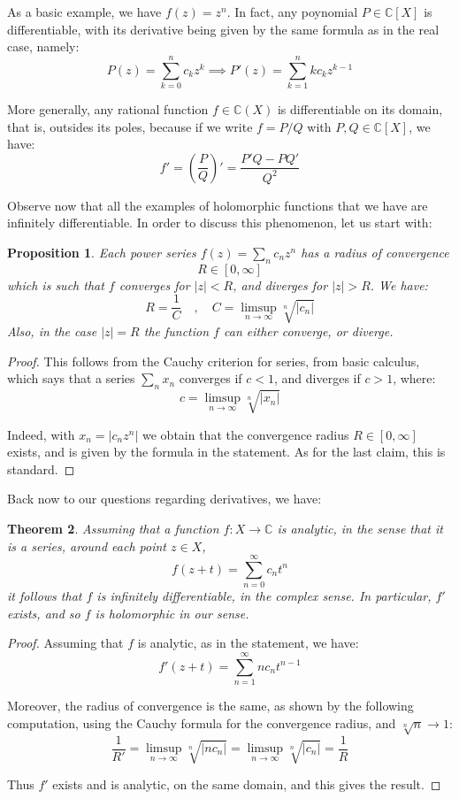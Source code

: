 \documentclass[12pt]{amsbook}
\newtheorem{theorem}{Theorem}[chapter]
\newtheorem{proposition}[theorem]{Proposition}
\begin{document}
As a basic example, we have $f(z)=z^n$. In fact, any poynomial $P\in\mathbb C[X]$ is differentiable, with its derivative being given by the same formula as in the real case, namely:
$$P(z)=\sum_{k=0}^nc_kz^k\implies P'(z)=\sum_{k=1}^nkc_kz^{k-1}$$

More generally, any rational function $f\in\mathbb C(X)$ is differentiable on its domain, that is, outsides its poles, because if we write $f=P/Q$ with $P,Q\in\mathbb C[X]$, we have:
$$f'=\left(\frac{P}{Q}\right)'=\frac{P'Q-PQ'}{Q^2}$$

Observe now that all the examples of holomorphic functions that we have are infinitely differentiable. In order to discuss this phenomenon, let us start with:

\begin{proposition}
Each power series $f(z)=\sum_nc_nz^n$ has a radius of convergence 
$$R\in[0,\infty]$$
which is such that $f$ converges for $|z|<R$, and diverges for $|z|>R$. We have:
$$R=\frac{1}{C}\quad,\quad C=\limsup_{n\to\infty}\sqrt[n]{|c_n|}$$
Also, in the case $|z|=R$ the function $f$ can either converge, or diverge.
\end{proposition}

\begin{proof}
This follows from the Cauchy criterion for series, from basic calculus, which says that a series $\sum_nx_n$ converges if $c<1$, and diverges if $c>1$, where:
$$c=\limsup_{n\to\infty}\sqrt[n]{|x_n|}$$

Indeed, with $x_n=|c_nz^n|$ we obtain that the convergence radius $R\in[0,\infty]$ exists, and is given by the formula in the statement. As for the last claim, this is standard.
\end{proof}

Back now to our questions regarding derivatives, we have:


\begin{theorem}
Assuming that a function $f:X\to\mathbb C$ is analytic, in the sense that it is a series, around each point $z\in X$, 
$$f(z+t)=\sum_{n=0}^\infty c_nt^n$$
it follows that $f$ is infinitely differentiable, in the complex sense. In particular, $f'$ exists, and so $f$ is holomorphic in our sense.
\end{theorem}

\begin{proof}
Assuming that $f$ is analytic, as in the statement, we have:
$$f'(z+t)=\sum_{n=1}^\infty nc_nt^{n-1}$$

Moreover, the radius of convergence is the same, as shown by the following computation, using the Cauchy formula for the convergence radius, and $\sqrt[n]{n}\to1$:
$$\frac{1}{R'}
=\limsup_{n\to\infty}\sqrt[n]{|nc_n|}
=\limsup_{n\to\infty}\sqrt[n]{|c_n|}
=\frac{1}{R}$$

Thus $f'$ exists and is analytic, on the same domain, and this gives the result.
\end{proof}
\end{document}
